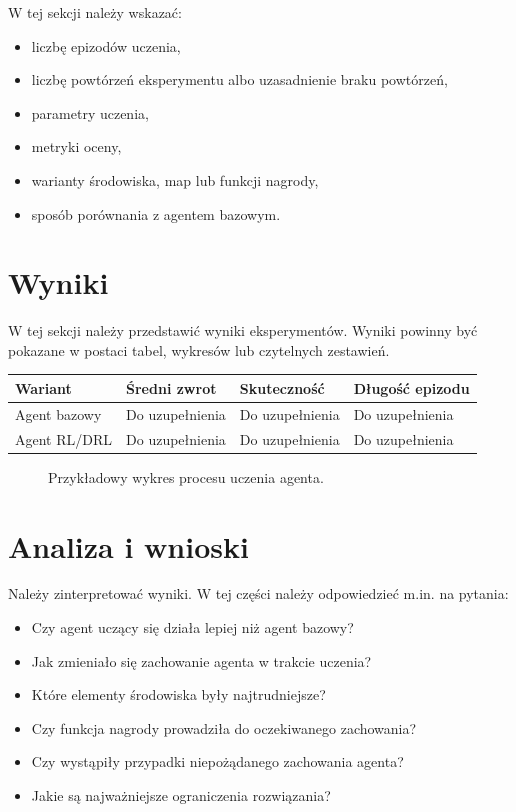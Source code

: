 \documentclass[12pt]{article}
\begin{document}
W tej sekcji należy wskazać:
\begin{itemize}
    \item liczbę epizodów uczenia,
    \item liczbę powtórzeń eksperymentu albo uzasadnienie braku powtórzeń,
    \item parametry uczenia,
    \item metryki oceny,
    \item warianty środowiska, map lub funkcji nagrody,
    \item sposób porównania z agentem bazowym.
\end{itemize}

\section{Wyniki}

W tej sekcji należy przedstawić wyniki eksperymentów. Wyniki powinny być pokazane w postaci tabel, wykresów lub czytelnych zestawień.

\begin{center}
\begin{tabular}{p{}p{}p{}p{}}
\toprule
Wariant & Średni zwrot & Skuteczność & Długość epizodu \\
\midrule
Agent bazowy & Do uzupełnienia & Do uzupełnienia & Do uzupełnienia \\
Agent RL/DRL & Do uzupełnienia & Do uzupełnienia & Do uzupełnienia \\
\bottomrule
\end{tabular}
\end{center}

\begin{figure}[h]
    \centering
    \caption{Przykładowy wykres procesu uczenia agenta.}
\end{figure}

\section{Analiza i wnioski}

Należy zinterpretować wyniki. W tej części należy odpowiedzieć m.in. na pytania:
\begin{itemize}
    \item Czy agent uczący się działa lepiej niż agent bazowy?
    \item Jak zmieniało się zachowanie agenta w trakcie uczenia?
    \item Które elementy środowiska były najtrudniejsze?
    \item Czy funkcja nagrody prowadziła do oczekiwanego zachowania?
    \item Czy wystąpiły przypadki niepożądanego zachowania agenta?
    \item Jakie są najważniejsze ograniczenia rozwiązania?
\end{itemize}
\end{document}
